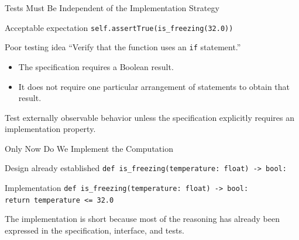 \documentclass[aspectratio=169,10pt]{beamer}
\begin{document}
\begin{frame}{Tests Must Be Independent of the Implementation Strategy}
  \begin{block}{Acceptable expectation}
    \texttt{self.assertTrue(is\_freezing(32.0))}
  \end{block}

  \begin{alertblock}{Poor testing idea}
    ``Verify that the function uses an \texttt{if} statement.''
  \end{alertblock}

  \begin{itemize}
    \item The specification requires a Boolean result.
    \item It does not require one particular arrangement of statements to obtain that result.
  \end{itemize}

  \begin{keyidea}
    Test externally observable behavior unless the specification explicitly requires an implementation property.
  \end{keyidea}
\end{frame}


\begin{frame}{Only Now Do We Implement the Computation}
  \begin{block}{Design already established}
    \texttt{def is\_freezing(temperature: float) -> bool:}
  \end{block}

  \begin{block}{Implementation}
    \texttt{def is\_freezing(temperature: float) -> bool:}\\
    \hspace*{0.20in}\texttt{return temperature <= 32.0}
  \end{block}

  \begin{keyidea}
    The implementation is short because most of the reasoning has already been expressed in the specification, interface, and tests.
  \end{keyidea}
\end{frame}
\end{document}

